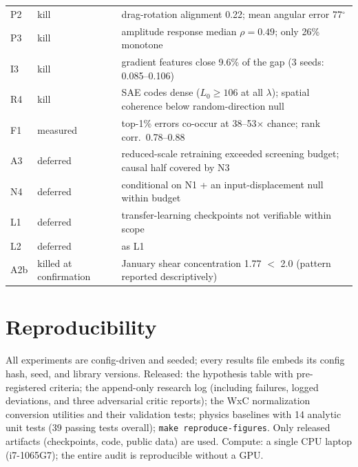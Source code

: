 \documentclass[10pt,twocolumn]{article}
\begin{document}
\begin{longtable}{llp{9.2cm}}
P2 & kill & drag-rotation alignment 0.22; mean angular error 77$^\circ$ \\
P3 & kill & amplitude response median $\rho=0.49$; only 26\% monotone \\
I3 & kill & gradient features close 9.6\% of the gap (3 seeds: 0.085--0.106) \\
R4 & kill & SAE codes dense ($L_0\ge106$ at all $\lambda$); spatial coherence below random-direction null \\
\addlinespace
F1 & measured & top-1\% errors co-occur at 38--53$\times$ chance; rank corr.\ 0.78--0.88 \\
\addlinespace
A3 & deferred & reduced-scale retraining exceeded screening budget; causal half covered by N3 \\
N4 & deferred & conditional on N1 + an input-displacement null within budget \\
L1 & deferred & transfer-learning checkpoints not verifiable within scope \\
L2 & deferred & as L1 \\
A2b & killed at confirmation & January shear concentration 1.77 $<$ 2.0 (pattern reported descriptively) \\
\bottomrule
\end{longtable}

\section{Reproducibility}\label{app:repro}
All experiments are config-driven and seeded; every results file embeds its config hash, seed, and library versions. Released: the hypothesis table with pre-registered criteria; the append-only research log (including failures, logged deviations, and three adversarial critic reports); the WxC normalization conversion utilities and their validation tests; physics baselines with 14 analytic unit tests (39 passing tests overall); \texttt{make reproduce-figures}. Only released artifacts (checkpoints, code, public data) are used. Compute: a single CPU laptop (i7-1065G7); the entire audit is reproducible without a GPU.
\end{document}
